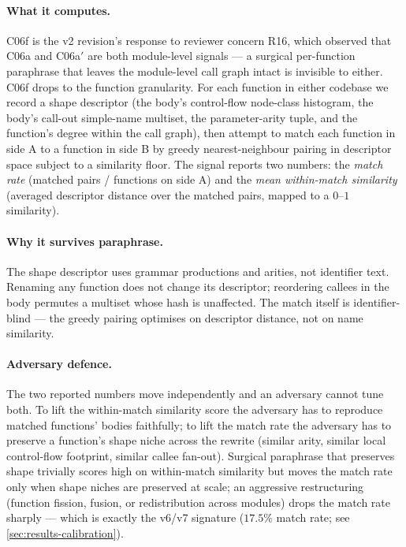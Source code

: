 \documentclass[11pt,letterpaper]{article}
\begin{document}
\paragraph{What it computes.} C06f is the v2 revision's response to
reviewer concern R16, which observed that C06a and C06a$'$ are
both module-level signals --- a surgical per-function paraphrase
that leaves the module-level call graph intact is invisible to
either. C06f drops to the function granularity. For each function
in either codebase we record a shape descriptor (the body's
control-flow node-class histogram, the body's call-out simple-name
multiset, the parameter-arity tuple, and the function's degree
within the call graph), then attempt to match each function in side
A to a function in side B by greedy nearest-neighbour pairing in
descriptor space subject to a similarity floor. The signal reports
two numbers: the \emph{match rate} (matched pairs / functions on
side A) and the \emph{mean within-match similarity} (averaged
descriptor distance over the matched pairs, mapped to a
$0$--$1$ similarity).

\paragraph{Why it survives paraphrase.} The shape descriptor uses
grammar productions and arities, not identifier text. Renaming any
function does not change its descriptor; reordering callees in the
body permutes a multiset whose hash is unaffected. The match
itself is identifier-blind --- the greedy pairing optimises on
descriptor distance, not on name similarity.

\paragraph{Adversary defence.} The two reported numbers move
independently and an adversary cannot tune both. To lift the
within-match similarity score the adversary has to reproduce
matched functions' bodies faithfully; to lift the match rate the
adversary has to preserve a function's shape niche across the
rewrite (similar arity, similar local control-flow footprint,
similar callee fan-out). Surgical paraphrase that preserves shape
trivially scores high on within-match similarity but moves the
match rate only when shape niches are preserved at scale; an
aggressive restructuring (function fission, fusion, or
redistribution across modules) drops the match rate
sharply --- which is exactly the v6/v7 signature
($17.5\%$ match rate; see \cref{sec:results-calibration}).
\end{document}
